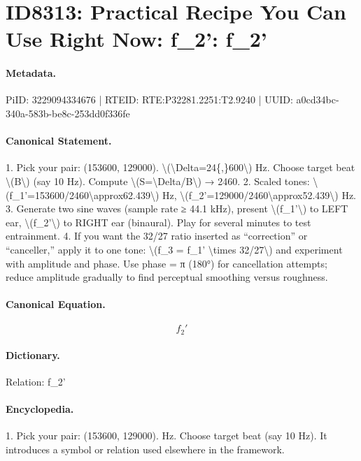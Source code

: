 \section*{ID8313: Practical Recipe You Can Use Right Now: f\_2': f\_2'}
\paragraph{Metadata.}
PiID: 3229094334676 | RTEID: RTE:P32281.2251:T2.9240 | UUID: a0cd34bc-340a-583b-be8c-253dd0f336fe

\paragraph{Canonical Statement.}
1. Pick your pair: (153600, 129000). \textbackslash{}(\textbackslash{}Delta=24\{,\}600\textbackslash{}) Hz. Choose target beat \textbackslash{}(B\textbackslash{}) (say 10 Hz). Compute \textbackslash{}(S=\textbackslash{}Delta/B\textbackslash{}) → 2460. 2. Scaled tones: \textbackslash{}(f\_1'=153600/2460\textbackslash{}approx62.439\textbackslash{}) Hz, \textbackslash{}(f\_2'=129000/2460\textbackslash{}approx52.439\textbackslash{}) Hz. 3. Generate two sine waves (sample rate ≥ 44.1 kHz), present \textbackslash{}(f\_1'\textbackslash{}) to LEFT ear, \textbackslash{}(f\_2'\textbackslash{}) to RIGHT ear (binaural). Play for several minutes to test entrainment. 4. If you want the 32/27 ratio inserted as “correction” or “canceller,” apply it to one tone: \textbackslash{}(f\_3 = f\_1' \textbackslash{}times 32/27\textbackslash{}) and experiment with amplitude and phase. Use phase = π (180°) for cancellation attempts; reduce amplitude gradually to find perceptual smoothing versus roughness.

\paragraph{Canonical Equation.}
\[
f_2'
\]

\paragraph{Dictionary.}
Relation: f\_2'

\paragraph{Encyclopedia.}
1. Pick your pair: (153600, 129000). Hz. Choose target beat (say 10 Hz). It introduces a symbol or relation used elsewhere in the framework.
